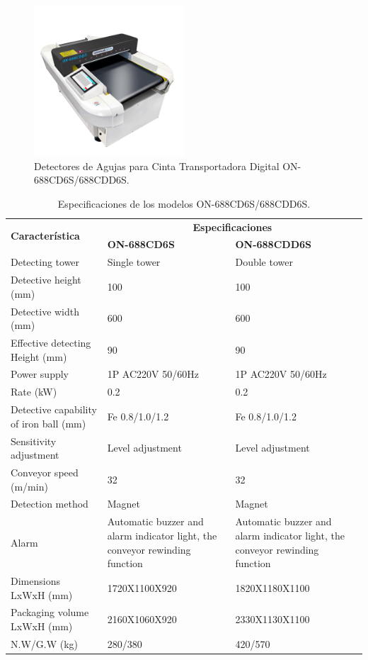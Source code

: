 \begin{figure}[H]
	\centering
	\includegraphics[width=0.5\textwidth]{img/oshima_conveyor.png}
	\caption{Detectores de Agujas para Cinta Transportadora Digital ON-688CD6S/688CDD6S.}
	\label{fig:oshima_conveyor}
\end{figure}

\begin{table}[H]
	\caption{Especificaciones de los modelos ON-688CD6S/688CDD6S.}
	\begin{tabularx}{\textwidth}{|X|X|X|}
		\hline
		\multirow{2}{*}[2pt]{\textbf{Característica}} & \multicolumn{2}{c|}{\textbf{Especificaciones}} \\ \cline{2-3}
		& \textbf{ON-688CD6S} & \textbf{ON-688CDD6S} \\
		\hline
		Detecting tower & Single tower & Double tower \\
		\hline
		Detective height (mm) & 100 & 100 \\
		\hline
		Detective width (mm) & 600 & 600 \\
		\hline
		Effective detecting Height (mm) & 90 & 90 \\
		\hline
		Power supply & 1P AC220V 50/60Hz & 1P AC220V 50/60Hz \\
		\hline
		Rate (kW) & 0.2 & 0.2 \\
		\hline
		Detective capability of iron ball (mm) & Fe 0.8/1.0/1.2 & Fe 0.8/1.0/1.2 \\
		\hline
		Sensitivity adjustment & Level adjustment & Level adjustment \\
		\hline
		Conveyor speed (m/min) & 32 & 32 \\
		\hline
		Detection method & Magnet & Magnet \\
		\hline
		Alarm & Automatic buzzer and alarm indicator light, the conveyor rewinding function & Automatic buzzer and alarm indicator light, the conveyor rewinding function \\
		\hline
		Dimensions LxWxH (mm) & 1720X1100X920 & 1820X1180X1100 \\
		\hline
		Packaging volume LxWxH (mm) & 2160X1060X920 & 2330X1130X1100 \\
		\hline
		N.W/G.W (kg) & 280/380 & 420/570 \\
		\hline
	\end{tabularx}
	\label{tab:specs_ON-688CD6S/688CDD6S}
\end{table}

